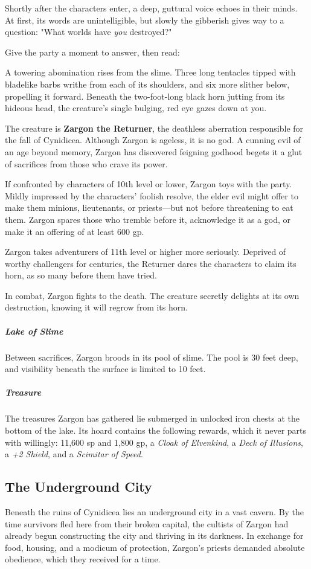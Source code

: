 \documentclass[10pt,a4paper,twoside,bg=print,twocolumn,openany,nodeprecatedcode]{dndbook}
\begin{document}
Shortly after the characters enter, a deep, guttural voice echoes in their minds. At first, its words are unintelligible, but slowly the gibberish gives way to a question: "What worlds have \textit{you} destroyed?"

Give the party a moment to answer, then read:

\begin{DndReadAloud}{}
A towering abomination rises from the slime. Three long tentacles tipped with bladelike barbs writhe from each of its shoulders, and six more slither below, propelling it forward. Beneath the two-foot-long black horn jutting from its hideous head, the creature's single bulging, red eye gazes down at you.

\end{DndReadAloud}

The creature is \textbf{Zargon the Returner}, the deathless aberration responsible for the fall of Cynidicea. Although Zargon is ageless, it is no god. A cunning evil of an age beyond memory, Zargon has discovered feigning godhood begets it a glut of sacrifices from those who crave its power.

If confronted by characters of 10th level or lower, Zargon toys with the party. Mildly impressed by the characters' foolish resolve, the elder evil might offer to make them minions, lieutenants, or priests—but not before threatening to eat them. Zargon spares those who tremble before it, acknowledge it as a god, or make it an offering of at least 600 gp.

Zargon takes adventurers of 11th level or higher more seriously. Deprived of worthy challengers for centuries, the Returner dares the characters to claim its horn, as so many before them have tried.

In combat, Zargon fights to the death. The creature secretly delights at its own destruction, knowing it will regrow from its horn.

\subparagraph{Lake of Slime}
Between sacrifices, Zargon broods in its pool of slime. The pool is 30 feet deep, and visibility beneath the surface is limited to 10 feet.

\subparagraph{Treasure}
The treasures Zargon has gathered lie submerged in unlocked iron chests at the bottom of the lake. Its hoard contains the following rewards, which it never parts with willingly: 11,600 sp and 1,800 gp, a \textit{Cloak of Elvenkind}, a \textit{Deck of Illusions}, a \textit{+2 Shield}, and a \textit{Scimitar of Speed}.

\subsection{The Underground City}
Beneath the ruins of Cynidicea lies an underground city in a vast cavern. By the time survivors fled here from their broken capital, the cultists of Zargon had already begun constructing the city and thriving in its darkness. In exchange for food, housing, and a modicum of protection, Zargon's priests demanded absolute obedience, which they received for a time.
\end{document}
